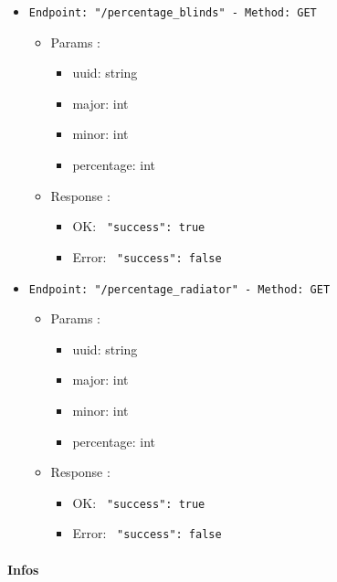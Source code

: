 \begin{itemize}
  \item \texttt{Endpoint: "/percentage_blinds" -  Method: GET}
  \begin{itemize} 
    \item Params :
    \begin{itemize}
      \item uuid: string
      \item major: int
      \item minor: int
      \item percentage: int
    \end{itemize}

    \item Response : 
    \begin{itemize}
      \item OK: \texttt{{ "success": true }}
      \item Error: \texttt{{ "success": false }}
    \end{itemize}
  \end{itemize}
\end{itemize}

\begin{itemize}
  \item \texttt{Endpoint: "/percentage_radiator" -  Method: GET}
  \begin{itemize} 
    \item Params :
    \begin{itemize}
      \item uuid: string
      \item major: int
      \item minor: int
      \item percentage: int
    \end{itemize}

    \item Response : 
    \begin{itemize}
      \item OK: \texttt{{ "success": true }}
      \item Error: \texttt{{ "success": false }}
    \end{itemize}
  \end{itemize}
\end{itemize}


\paragraph{Infos}

